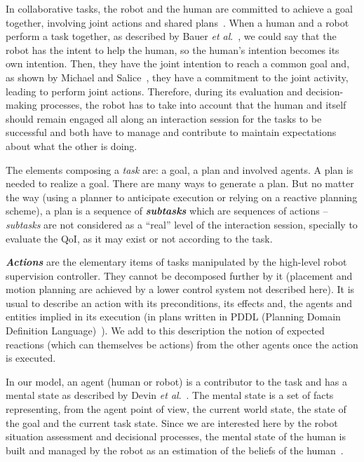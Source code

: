 \documentclass[a4paper,11pt,twoside]{StyleThese}
\begin{document}
In collaborative tasks, the robot and the human are committed to achieve a goal together, involving joint actions and shared plans~\cite{grosz_1996_collaborative}.  When a human and a robot perform a task together, as described by Bauer \textit{et al}.~\cite{bauer_2008_collab}, we could say that the robot has the intent to help the human, so the human's intention becomes its own intention. Then, they have the joint intention to reach a common goal and, as shown by Michael and Salice~\cite{michael_2017_commitment}, they have a commitment to the joint activity, leading to perform joint actions. Therefore, during its evaluation and decision-making processes, the robot has to take into account that the human and itself should remain engaged all along an interaction session for the tasks to be successful and both have to manage and contribute to maintain expectations about what the other is doing. 

The elements composing a \textit{task} are: a goal, a plan and involved agents. A plan is needed to realize a goal. There are many ways to generate a plan. But no matter the way (using a planner to anticipate execution or relying on a reactive planning scheme), a plan is a sequence of \textbf{\textit{subtasks}} which are sequences of actions -- \textit{subtasks} are not considered as a ``real'' level of the interaction session, specially to evaluate the QoI, as it may exist or not according to the task.

\textbf{\textit{Actions}} are the elementary items of tasks manipulated by the high-level robot supervision controller. They cannot be decomposed further by it (\eg placement and motion planning are achieved by a lower control system not described here). It is usual to describe an action with its preconditions, its effects and, the agents and entities implied in its execution (\eg in plans written in PDDL (Planning Domain Definition Language)~\cite{ghallab_98_pddl}). We add to this description the notion of expected reactions (which can themselves be actions) from the other agents once the action is executed.

In our model, an agent (human or robot) is a contributor to the task and has a mental state as described by Devin \textit{et al}.~\cite{devin_2016_implemented}. The mental state is a set of facts representing, from the agent point of view, the current world state, the state of the goal and the current task state. Since we are interested here by the robot situation assessment and decisional processes, the mental state of the human is built and managed by the robot as an estimation of the beliefs of the human~\cite{milliez_2014_framework, hiatt_2017_modeling,tabrez_2020}.
\end{document}
